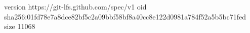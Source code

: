 version https://git-lfs.github.com/spec/v1
oid sha256:01fd78e7a8dce82bf5c2a09bbf58bf8a40cc8e122d0981a784f52a5b5bc71fed
size 11068
